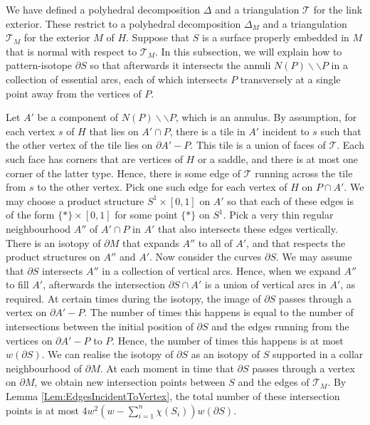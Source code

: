 \documentclass[oneside]{amsart}
\numberwithin{equation}{section}
\theoremstyle{plain}
\theoremstyle{definition}
\newcommand{\calT}{{\mathcal{T}}}
\newcommand{\cut}{\backslash\backslash}
\begin{document}
We have defined a polyhedral decomposition $\Delta$ and a triangulation $\mathcal{T}$ for the link exterior.
These restrict to a polyhedral decomposition $\Delta_M$ and a triangulation $\mathcal{T}_M$
for the exterior $M$ of $H$. Suppose that $S$ is a surface properly embedded in $M$ that is normal with respect
to $\mathcal{T}_M$. In this subsection, we will explain how to pattern-isotope $\partial S$ so that afterwards it intersects the annuli $N(P) \cut P$ in a collection of essential arcs,
each of which intersects $P$ transversely at a single point away from the vertices of $P$.

Let $A'$ be a component of $N(P) \cut P$, which is an annulus. By assumption, for each vertex $s$ of $H$ that lies on $A' \cap P$, there is a tile in $A'$ incident to $s$ such that the other vertex of the tile lies on $\partial A' -  P$. This tile is a union of faces of $\calT$. Each such face has corners that are vertices of $H$ or a saddle, and there is at most one corner of the latter type. Hence, there is some edge of $\calT$ running across the tile from $s$ to the other vertex. Pick one such edge for each vertex of $H$ on $P \cap A'$. We may choose a product structure $S^1 \times [0,1]$ on $A'$ so that each of these edges is of the form $\{ \ast \} \times [0,1]$ for some point $\{ \ast \}$ on $S^1$. Pick a very thin regular neighbourhood $A''$ of $A' \cap P$ in $A'$ that also intersects these edges vertically. There is an isotopy of $\partial M$ that expands $A''$ to all of $A'$, and that respects the product structures on $A''$ and $A'$. Now consider the curves $\partial S$. We may assume that $\partial S$ intersects $A''$ in a collection of vertical arcs. Hence, when we expand $A''$ to fill $A'$, afterwards the intersection $\partial S \cap A'$ is a union of vertical arcs in $A'$, as required. At certain times during the isotopy, the image of $\partial S$ passes through a vertex on $\partial A' - P$. The number of times this happens is equal to the number of intersections between the initial position of $\partial S$ and the edges running from the vertices on $\partial A' - P$ to $P$. Hence, the number of times this happens is at most $w(\partial S)$. We can realise the isotopy of $\partial S$ as an isotopy of $S$ supported in a collar neighbourhood of $\partial M$. At each moment in time that $\partial S$ passes through a vertex on $\partial M$, we obtain new intersection points between $S$ and the edges of $\calT_M$. By Lemma \ref{Lem:EdgesIncidentToVertex}, the total number of these intersection points is at most 
$4w^2(w - \sum_{i=1}^n \chi(S_i)) w(\partial S) $.
\end{document}
